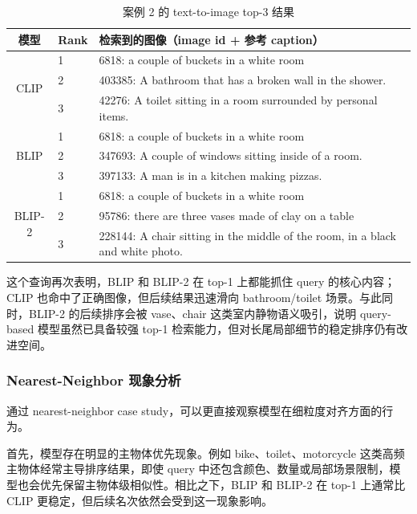 \documentclass[UTF8,a4paper,10pt]{ctexart}
\begin{document}
\begin{table}[H]
    \centering
    \caption{案例 2 的 text-to-image top-3 结果}
    \begin{tabular}{clp{8.5cm}}
        \toprule
        模型 & Rank & 检索到的图像（image id + 参考 caption） \\
        \midrule
        \multirow{3}{*}{CLIP}
        & 1 & 6818: a couple of buckets in a white room \\
        & 2 & 403385: A bathroom that has a broken wall in the shower. \\
        & 3 & 42276: A toilet sitting in a room surrounded by personal items. \\
        \midrule
        \multirow{3}{*}{BLIP}
        & 1 & 6818: a couple of buckets in a white room \\
        & 2 & 347693: A couple of windows sitting inside of a room. \\
        & 3 & 397133: A man is in a kitchen making pizzas. \\
        \midrule
        \multirow{3}{*}{BLIP-2}
        & 1 & 6818: a couple of buckets in a white room \\
        & 2 & 95786: there are three vases made of clay on a table \\
        & 3 & 228144: A chair sitting in the middle of the room, in a black and white photo. \\
        \bottomrule
    \end{tabular}
\end{table}

这个查询再次表明，BLIP 和 BLIP-2 在 top-1 上都能抓住 query 的核心内容；CLIP 也命中了正确图像，但后续结果迅速滑向 bathroom/toilet 场景。与此同时，BLIP-2 的后续排序会被 vase、chair 这类室内静物语义吸引，说明 query-based 模型虽然已具备较强 top-1 检索能力，但对长尾局部细节的稳定排序仍有改进空间。

\subsubsection{Nearest-Neighbor 现象分析}

通过 nearest-neighbor case study，可以更直接观察模型在细粒度对齐方面的行为。

首先，模型存在明显的主物体优先现象。例如 bike、toilet、motorcycle 这类高频主物体经常主导排序结果，即使 query 中还包含颜色、数量或局部场景限制，模型也会优先保留主物体级相似性。相比之下，BLIP 和 BLIP-2 在 top-1 上通常比 CLIP 更稳定，但后续名次依然会受到这一现象影响。
\end{document}
